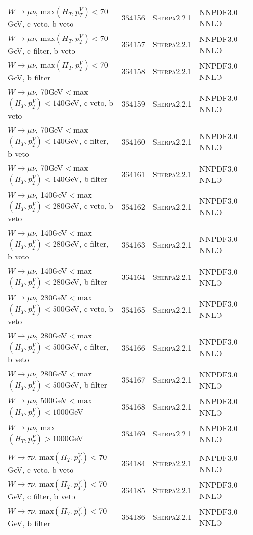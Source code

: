 \begin{table}[h!]
\begin{center}
{\begin{tabular}{@{} lcll @{}}
$W\rightarrow \mu\nu$, max$(H_T,p_T^V)<70$GeV, c veto, b veto &  364156& \textsc{Sherpa2.2.1} &NNPDF3.0 NNLO \\
$W\rightarrow \mu\nu$, max$(H_T,p_T^V)<70$GeV, c filter, b veto & 364157& \textsc{Sherpa2.2.1} &NNPDF3.0 NNLO \\
$W\rightarrow \mu\nu$, max$(H_T,p_T^V)<70$GeV, b filter & 364158& \textsc{Sherpa2.2.1} &NNPDF3.0 NNLO \\
$W\rightarrow \mu\nu$, 70GeV$<$max$(H_T,p_T^V)<140$GeV, c veto, b veto & 364159& \textsc{Sherpa2.2.1} &NNPDF3.0 NNLO \\
$W\rightarrow \mu\nu$, 70GeV$<$max$(H_T,p_T^V)<140$GeV, c filter, b veto & 364160& \textsc{Sherpa2.2.1} &NNPDF3.0 NNLO \\
$W\rightarrow \mu\nu$, 70GeV$<$max$(H_T,p_T^V)<140$GeV, b filter & 364161& \textsc{Sherpa2.2.1} &NNPDF3.0 NNLO \\
$W\rightarrow \mu\nu$, 140GeV$<$max$(H_T,p_T^V)<280$GeV, c veto, b veto & 364162&  \textsc{Sherpa2.2.1} &NNPDF3.0 NNLO \\
$W\rightarrow \mu\nu$, 140GeV$<$max$(H_T,p_T^V)<280$GeV, c filter, b veto & 364163& \textsc{Sherpa2.2.1} &NNPDF3.0 NNLO \\
$W\rightarrow \mu\nu$, 140GeV$<$max$(H_T,p_T^V)<280$GeV, b filter & 364164& \textsc{Sherpa2.2.1} &NNPDF3.0 NNLO \\
$W\rightarrow \mu\nu$, 280GeV$<$max$(H_T,p_T^V)<500$GeV, c veto, b veto & 364165& \textsc{Sherpa2.2.1} &NNPDF3.0 NNLO \\
$W\rightarrow \mu\nu$, 280GeV$<$max$(H_T,p_T^V)<500$GeV, c filter, b veto & 364166& \textsc{Sherpa2.2.1} &NNPDF3.0 NNLO \\
$W\rightarrow \mu\nu$, 280GeV$<$max$(H_T,p_T^V)<500$GeV, b filter &  364167& \textsc{Sherpa2.2.1} &NNPDF3.0 NNLO \\
$W\rightarrow \mu\nu$, 500GeV$<$max$(H_T,p_T^V)<1000$GeV & 364168& \textsc{Sherpa2.2.1} &NNPDF3.0 NNLO \\
$W\rightarrow \mu\nu$, max$(H_T,p_T^V)>1000$GeV&  364169&	 \textsc{Sherpa2.2.1} &NNPDF3.0 NNLO \\	\\
$W\rightarrow \tau\nu$, max$(H_T,p_T^V)<70$GeV, c veto, b veto &  364184& \textsc{Sherpa2.2.1} &NNPDF3.0 NNLO \\
$W\rightarrow \tau\nu$, max$(H_T,p_T^V)<70$GeV, c filter, b veto & 364185& \textsc{Sherpa2.2.1} &NNPDF3.0 NNLO \\
$W\rightarrow \tau\nu$, max$(H_T,p_T^V)<70$GeV, b filter & 364186& \textsc{Sherpa2.2.1} &NNPDF3.0 NNLO \\

\end{tabular}}
\end{center}
\end{table}
